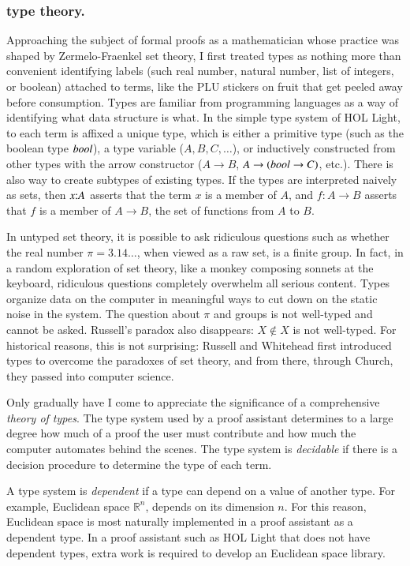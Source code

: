 \documentclass{llncs}
\def\op#1{{\hbox{#1}}}
\def\tc{\hbox{:}}
\newcommand{\ring}[1]{\mathbb{#1}}
\begin{document}
\subsubsection{type theory.}

Approaching the subject of formal proofs as a mathematician whose
practice was shaped by Zermelo-Fraenkel set theory, I first treated
types as nothing more than convenient identifying labels (such real
number, natural number, list of integers, or boolean) attached to
terms, like the
PLU stickers on fruit that get peeled away before consumption.  Types
are familiar from programming languages as a way of identifying what
data structure is what.  In the simple type system of HOL Light, to
each term is affixed a unique type, which is either a primitive type
(such as the boolean type $\op{\it bool}$), a type variable
($A,B,C,\ldots$), or inductively constructed from other types with the
arrow constructor ($A\rightarrow B$, $A\rightarrow (\op{\it bool}
\rightarrow C)$, etc.).  There is also way to create subtypes of
existing types.  If the types are interpreted naively as sets, then
$x\tc A$ asserts that the term $x$ is a member of $A$, and
$f:A\rightarrow B$ asserts that $f$ is a member of $A\rightarrow B$,
the set of functions from $A$ to $B$.

In untyped set theory, it is possible to ask ridiculous questions such
as whether the real number $\pi=3.14\ldots$, when viewed as a raw set,
is a finite group.  In fact, in a random exploration of set theory,
like a monkey composing sonnets at the keyboard, ridiculous questions
completely overwhelm all serious content.  Types organize data on the
computer in meaningful ways to cut down on the static noise in the
system.  The question about $\pi$ and groups is not well-typed and
cannot be asked.  Russell's paradox also disappears: $X \not\in X$ is
not well-typed.  For historical reasons, this is not surprising:
Russell and Whitehead first introduced types to overcome the paradoxes of
set theory, and from there, through Church, they passed into computer
science.


Only gradually have I come to appreciate the significance of a
comprehensive {\it theory of types}.  The type system used by a proof
assistant determines to a large degree how much of a proof the user
must contribute and how much the computer automates behind the scenes.
The type system is {\it decidable} if there is a decision procedure to
determine the type of each term.

A type system is {\it dependent} if a type can depend on a value of
another type.  For example, Euclidean space $\ring{R}^n$, depends on
its dimension $n$.  For this reason, Euclidean space is most naturally
implemented in a proof assistant as a dependent type.  
In a proof assistant such as HOL Light that does not have dependent types,
extra work is required to develop an Euclidean space library.
\end{document}

